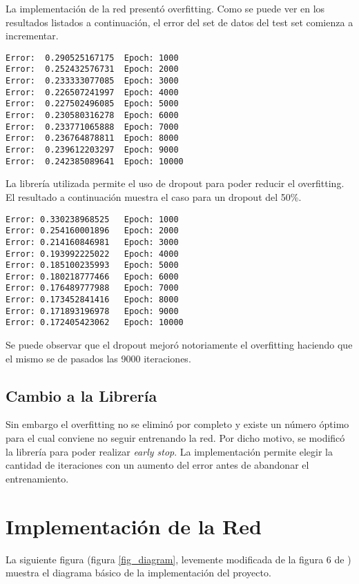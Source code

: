 \documentclass[conference]{IEEEtran}
\theoremstyle{definition}
\begin{document}
La implementación de la red presentó overfitting. Como se puede ver en los resultados listados a continuación, el error del set de datos del test set comienza a incrementar.

\begin{lstlisting}[frame=single]
Error: 	0.290525167175 	Epoch: 1000
Error: 	0.252432576731 	Epoch: 2000
Error: 	0.233333077085 	Epoch: 3000
Error: 	0.226507241997 	Epoch: 4000
Error: 	0.227502496085 	Epoch: 5000
Error: 	0.230580316278 	Epoch: 6000
Error: 	0.233771065888 	Epoch: 7000
Error: 	0.236764878811 	Epoch: 8000
Error: 	0.239612203297 	Epoch: 9000
Error: 	0.242385089641 	Epoch: 10000
\end{lstlisting}

La librería utilizada \cite{NIMBLENET} permite el uso de dropout para poder reducir el overfitting. El resultado a continuación muestra el caso para un dropout del 50\%.

\begin{lstlisting}[frame=single]
Error: 0.330238968525 	Epoch: 1000
Error: 0.254160001896 	Epoch: 2000
Error: 0.214160846981 	Epoch: 3000
Error: 0.193992225022 	Epoch: 4000
Error: 0.185100235993 	Epoch: 5000
Error: 0.180218777466 	Epoch: 6000
Error: 0.176489777988 	Epoch: 7000
Error: 0.173452841416 	Epoch: 8000
Error: 0.171893196978 	Epoch: 9000
Error: 0.172405423062 	Epoch: 10000
\end{lstlisting}

Se puede observar que el dropout mejoró notoriamente el overfitting haciendo que el mismo se de pasados las 9000 iteraciones.

\subsection{Cambio a la Librería}
Sin embargo el overfitting no se eliminó por completo y existe un número óptimo para el cual conviene no seguir entrenando la red. Por dicho motivo, se modificó la librería para poder realizar \textit{early stop}. 
La implementación permite elegir la cantidad de iteraciones con un aumento del error antes de abandonar el entrenamiento.  

\section{Implementación de la Red} \label{sec_config}

La siguiente figura (figura \ref{fig_diagram}, levemente modificada de la figura 6 de \cite{NN_HEALTHCARE}) muestra el diagrama básico de la implementación del proyecto.
\end{document}
